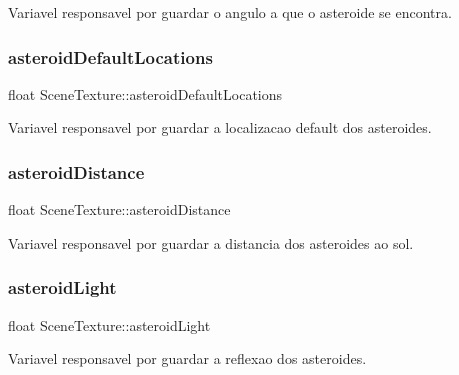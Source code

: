 Variavel responsavel por guardar o angulo a que o asteroide se encontra. 

\mbox{\label{class_scene_texture_a7f1a27f3c44ee4c17d0394f37255cd46}} 
\subsubsection{\texorpdfstring{asteroidDefaultLocations}{asteroidDefaultLocations}}
{\footnotesize\ttfamily float Scene\+Texture\+::asteroid\+Default\+Locations\hspace{0.3cm}{\ttfamily [static]}}



Variavel responsavel por guardar a localizacao default dos asteroides. 

\mbox{\label{class_scene_texture_ae26e5fac3105908842e7bd0fa351115f}} 
\subsubsection{\texorpdfstring{asteroidDistance}{asteroidDistance}}
{\footnotesize\ttfamily float Scene\+Texture\+::asteroid\+Distance\hspace{0.3cm}{\ttfamily [static]}}



Variavel responsavel por guardar a distancia dos asteroides ao sol. 

\mbox{\label{class_scene_texture_ab4d8e8de2b4a9a8ee02af998cfe76a32}} 
\subsubsection{\texorpdfstring{asteroidLight}{asteroidLight}}
{\footnotesize\ttfamily float Scene\+Texture\+::asteroid\+Light\hspace{0.3cm}{\ttfamily [static]}}



Variavel responsavel por guardar a reflexao dos asteroides. 

